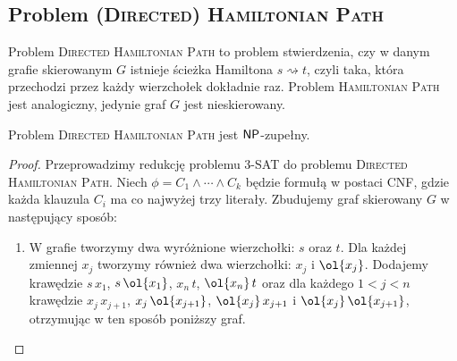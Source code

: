\subsection{Problem \textsc{(Directed) Hamiltonian Path}}

Problem \textsc{Directed Hamiltonian Path} to problem stwierdzenia, czy w danym grafie skierowanym $G$ istnieje ścieżka Hamiltona $s \rightsquigarrow t$, czyli taka, która przechodzi przez każdy wierzchołek dokładnie raz. Problem \textsc{Hamiltonian Path} jest analogiczny, jedynie graf $G$ jest nieskierowany.

\begin{theorem}\label{t:Directed Hamiltonian Path}
    Problem \textsc{Directed Hamiltonian Path} jest $\textsf{NP}$-zupełny.
\end{theorem}
\begin{proof}
    Przeprowadzimy redukcję problemu 3-SAT do problemu \textsc{Directed Hamiltonian Path}. Niech $\phi = C_1 \land \cdots \land C_k$ będzie formułą w postaci CNF, gdzie każda klauzula $C_i$ ma co najwyżej trzy literały. Zbudujemy graf skierowany $G$ w następujący sposób:
    \begin{enumerate}
        \item W grafie tworzymy dwa wyróżnione wierzchołki: $s$ oraz $t$. Dla każdej zmiennej $x_j$ tworzymy również dwa wierzchołki: $x_j$ i $\ol{x_j}$. Dodajemy krawędzie $s\,x_1$, $s\,\ol{x_1}$, $x_n\,t$, $\ol{x_n}\,t$ oraz dla każdego $1 < j < n$ krawędzie $x_j\,x_{j+1}$, $x_j\,\ol{x_{j+1}}$, $\ol{x_j}\,x_{j+1}$ i $\ol{x_j}\,\ol{x_{j+1}}$, otrzymując w ten sposób poniższy graf.
        \begin{figure}[H]
            \centering
        \end{figure}


\end{enumerate}
\end{proof}
